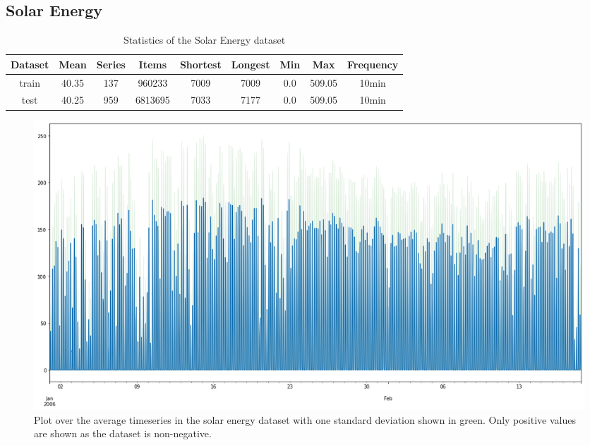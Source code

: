 \clearpage
\subsection{Solar Energy}


\begin{table}[htb]
  \begin{tabular}{||c | c c c c c c c c ||}
    \hline
    Dataset & Mean  & Series & Items   & Shortest & Longest & Min & Max    & Frequency \\ [0.5ex]
    \hline\hline
    train   & 40.35 & 137    & 960233  & 7009     & 7009    & 0.0 & 509.05 & 10min     \\
    \hline
    test    & 40.25 & 959    & 6813695 & 7033     & 7177    & 0.0 & 509.05 & 10min     \\
    \hline
  \end{tabular}
  \caption{Statistics of the Solar Energy dataset}
\end{table}


\begin{figure}[htb]
  \centering
  \includegraphics[width=\linewidth]{./img/solar-energy_plot.png}
  \caption{Plot over the average timeseries in the solar energy dataset with one standard deviation shown in green. Only positive values are shown as the dataset is non-negative.}
  \label{fig:solar-energy_plot}
  \endminipage\hfill
\end{figure}

